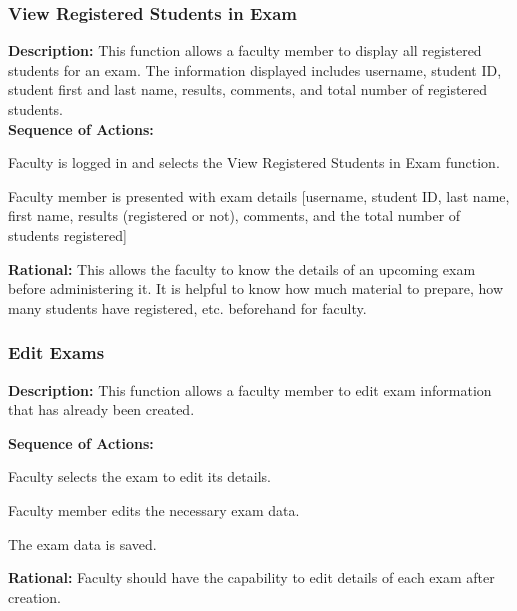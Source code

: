    \subsubsection{\large View Registered Students in Exam} 
   \begin{boxed} %
      \textbf{Description:}
      {\small This function allows a faculty member to display all registered
         students for an exam. The information displayed includes username,
         student ID, student first and last name, results, comments, and total number
         of registered students.} \\
         
         \textbf{Sequence of Actions:}
         \begin{enumerate}
               {\small
            \item Faculty is logged in and selects the View Registered Students
               in Exam function.
            \item Faculty member is presented with exam details [username,
               student ID, last name, first name, results (registered or not),
               comments, and the total number of students registered]}
         \end{enumerate}

         \textbf{Rational:}
         {\small This allows the faculty to know the details of an upcoming exam before
         administering it. It is helpful to know how much material to prepare,
         how many students have registered, etc. beforehand for faculty.}
   \end{boxed} %

   \subsubsection{\large Edit Exams} 
   \begin{boxed} %
      \textbf{Description:}
      {\small This function allows a faculty member to edit exam information
         that has already been created.}
         
         \textbf{Sequence of Actions:}
         \begin{enumerate}
               {\small
            \item Faculty selects the exam to edit its details.
            \item Faculty member edits the necessary exam data.
            \item The exam data is saved.}
         \end{enumerate}

         \textbf{Rational:}
         {\small Faculty should have the capability to edit details of each exam after
         creation.}
   \end{boxed} %

